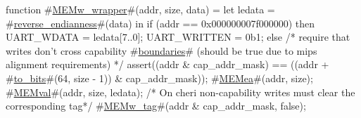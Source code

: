 function #\hyperref[zMEMwzywrapper]{MEMw\_wrapper}#(addr, size, data) =
  let ledata = #\hyperref[zreversezyendianness]{reverse\_endianness}#(data) in
  if (addr == 0x000000007f000000) then
  {
    UART_WDATA   = ledata[7..0];
    UART_WRITTEN = 0b1;
  }
  else
  {
    /* require that writes don't cross capability #\hyperref[zboundaries]{boundaries}# (should be true due to mips alignment requirements) */  
    assert((addr & cap_addr_mask) == ((addr + #\hyperref[ztozybits]{to\_bits}#(64, size - 1)) & cap_addr_mask));
    #\hyperref[zMEMea]{MEMea}#(addr, size);
    #\hyperref[zMEMval]{MEMval}#(addr, size, ledata);
    /* On cheri non-capability writes must clear the corresponding tag*/
    #\hyperref[zMEMwzytag]{MEMw\_tag}#(addr & cap_addr_mask, false);
  }

